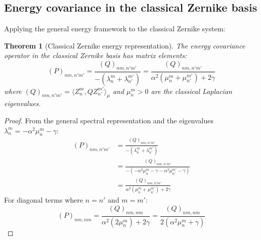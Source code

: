 \documentclass[a4paper,12pt]{article}
\newtheorem{theorem}{Theorem}[section]
\newcommand{\inner}[2]{\langle #1, #2 \rangle}
\begin{document}
\subsection{Energy covariance in the classical Zernike basis}

Applying the general energy framework to the classical Zernike system:

\begin{theorem}[Classical Zernike energy representation]\label{thm:zernike_energy}
The energy covariance operator in the classical Zernike basis has matrix elements:
\begin{equation}
(P)_{nm,n'm'} = \frac{(Q)_{nm,n'm'}}{-(\lambda_n^m + \lambda_{n'}^{m'})} = \frac{(Q)_{nm,n'm'}}{\alpha^2(\mu_n^m + \mu_{n'}^{m'}) + 2\gamma}
\end{equation}
where $(Q)_{nm,n'm'} = \inner{Z_n^m}{QZ_{n'}^{m'}}_\mu$ and $\mu_n^m > 0$ are the classical Laplacian eigenvalues.
\end{theorem}

\begin{proof}
From the general spectral representation and the eigenvalues $\lambda_n^m = -\alpha^2 \mu_n^m - \gamma$:
\begin{align}
(P)_{nm,n'm'} &= \frac{(Q)_{nm,n'm'}}{-(\lambda_n^m + \lambda_{n'}^{m'})}\\
&= \frac{(Q)_{nm,n'm'}}{-(-\alpha^2 \mu_n^m - \gamma - \alpha^2 \mu_{n'}^{m'} - \gamma)}\\
&= \frac{(Q)_{nm,n'm'}}{\alpha^2(\mu_n^m + \mu_{n'}^{m'}) + 2\gamma}
\end{align}
For diagonal terms where $n = n'$ and $m = m'$:
\begin{equation}
(P)_{nm,nm} = \frac{(Q)_{nm,nm}}{\alpha^2(2\mu_n^m) + 2\gamma} = \frac{(Q)_{nm,nm}}{2(\alpha^2 \mu_n^m + \gamma)}
\end{equation}
\end{proof}
\end{document}
